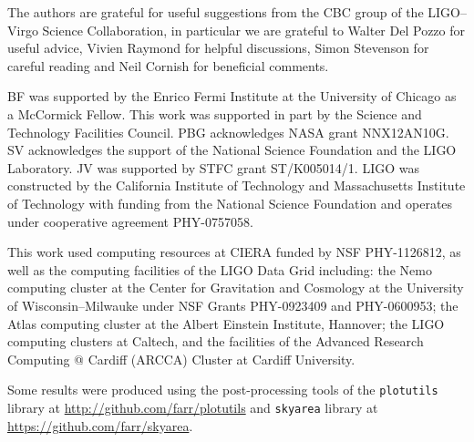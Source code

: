 \acknowledgements

The authors are grateful for useful suggestions from the CBC group of the LIGO--Virgo Science Collaboration, in particular we are grateful to Walter Del Pozzo for useful advice, Vivien Raymond for helpful discussions, Simon Stevenson for careful reading and Neil Cornish for beneficial comments.

BF was supported by the Enrico Fermi Institute at the University of Chicago as a McCormick Fellow.  This work was supported in part by the Science and Technology Facilities Council. PBG acknowledges NASA grant NNX12AN10G. SV acknowledges the support of the National Science Foundation and the LIGO Laboratory. JV was supported by STFC grant ST/K005014/1. LIGO was constructed by the California Institute of Technology and Massachusetts Institute of Technology with funding from the National Science Foundation and operates under cooperative agreement PHY-0757058.

This work used computing resources at CIERA funded by NSF PHY-1126812, as well as the computing facilities of the LIGO Data Grid including: the Nemo computing cluster at the Center for Gravitation and Cosmology at the University of Wisconsin--Milwauke under NSF Grants PHY-0923409 and PHY-0600953; the Atlas computing cluster at the Albert Einstein Institute, Hannover; the LIGO computing clusters at Caltech, and the facilities of the Advanced Research Computing @ Cardiff (ARCCA) Cluster at Cardiff University.

Some results were produced using the post-processing tools of the \texttt{plotutils} library at \url{http://github.com/farr/plotutils} and \texttt{skyarea} library at \url{https://github.com/farr/skyarea}.
  
  
  
  
  
  